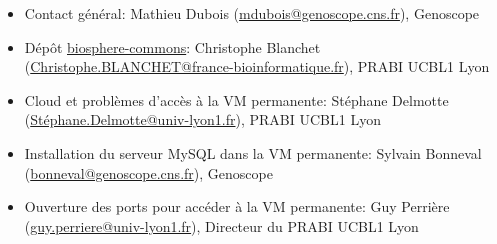 \begin{itemize}
	\item Contact général: Mathieu Dubois (\href{mailto:mdubois@genoscope.cns.fr}{mdubois@genoscope.cns.fr}), Genoscope
	\item Dépôt \href{https://github.com/IFB-ElixirFr/biosphere-commons}{biosphere-commons}: Christophe Blanchet (\href{mailto:Christophe.BLANCHET@france-bioinformatique.fr}{Christophe.BLANCHET@france-bioinformatique.fr}), PRABI UCBL1 Lyon
	\item Cloud  et problèmes d'accès à la VM permanente: Stéphane Delmotte (\href{mailto:Stéphane.Delmotte@univ-lyon1.fr}{Stéphane.Delmotte@univ-lyon1.fr}), PRABI UCBL1 Lyon
	\item Installation du serveur MySQL dans la VM permanente: Sylvain Bonneval (\href{mailto:bonneval@genoscope.cns.fr}{bonneval@genoscope.cns.fr}), Genoscope
	\item Ouverture des ports pour accéder à la VM permanente: Guy Perrière (\href{mailto:guy.perriere@univ-lyon1.fr}{guy.perriere@univ-lyon1.fr}), Directeur du PRABI UCBL1 Lyon
\end{itemize}
